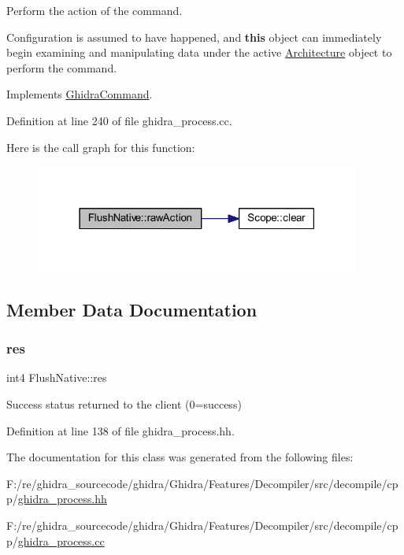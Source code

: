 Perform the action of the command. 

Configuration is assumed to have happened, and {\bfseries{this}} object can immediately begin examining and manipulating data under the active \mbox{\hyperlink{class_architecture}{Architecture}} object to perform the command. 

Implements \mbox{\hyperlink{class_ghidra_command_a7d1a5cfedfd8f1d05161d27627302716}{Ghidra\+Command}}.



Definition at line 240 of file ghidra\+\_\+process.\+cc.

Here is the call graph for this function\+:
\nopagebreak
\begin{figure}[H]
\begin{center}
\leavevmode
\includegraphics[width=303pt]{class_flush_native_a92fb03dcd3fb080a2033442403cde93c_cgraph}
\end{center}
\end{figure}


\subsection{Member Data Documentation}
\mbox{\label{class_flush_native_a055504c13f53d5647e26054e3ff82ff0}} 
\subsubsection{\texorpdfstring{res}{res}}
{\footnotesize\ttfamily int4 Flush\+Native\+::res}



Success status returned to the client (0=success) 



Definition at line 138 of file ghidra\+\_\+process.\+hh.



The documentation for this class was generated from the following files\+:\begin{DoxyCompactItemize}
\item 
F\+:/re/ghidra\+\_\+sourcecode/ghidra/\+Ghidra/\+Features/\+Decompiler/src/decompile/cpp/\mbox{\hyperlink{ghidra__process_8hh}{ghidra\+\_\+process.\+hh}}\item 
F\+:/re/ghidra\+\_\+sourcecode/ghidra/\+Ghidra/\+Features/\+Decompiler/src/decompile/cpp/\mbox{\hyperlink{ghidra__process_8cc}{ghidra\+\_\+process.\+cc}}\end{DoxyCompactItemize}

